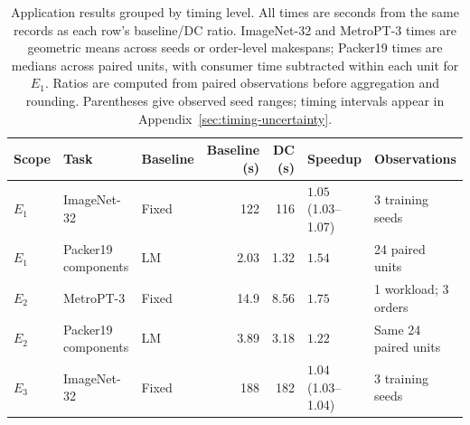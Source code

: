 \begin{table}[!t]
\centering
\caption{Application results grouped by timing level. All times are seconds from the same records as each row's baseline/DC ratio. ImageNet-32 and MetroPT-3 times are geometric means across seeds or order-level makespans; Packer19 times are medians across paired units, with consumer time subtracted within each unit for $E_1$. Ratios are computed from paired observations before aggregation and rounding. Parentheses give observed seed ranges; timing intervals appear in Appendix~\ref{sec:timing-uncertainty}.}
\label{tab:main-results}
\small
\setlength{\tabcolsep}{5pt}
\renewcommand{\arraystretch}{1.15}
\begin{tabular}{@{}lllrrll@{}}
\toprule
Scope & Task & Baseline & Baseline (s) & DC (s) & Speedup & Observations \\
\midrule
$E_1$ & ImageNet-32 & Fixed & 122 & 116 & $1.05$ (1.03--1.07) & 3 training seeds \\
$E_1$ & Packer19 components & LM & 2.03 & 1.32 & $1.54$ & 24 paired units \\
$E_2$ & MetroPT-3 & Fixed & 14.9 & 8.56 & $1.75$ & 1 workload; 3 orders \\
$E_2$ & Packer19 components & LM & 3.89 & 3.18 & $1.22$ & Same 24 paired units \\
$E_3$ & ImageNet-32 & Fixed & 188 & 182 & $1.04$ (1.03--1.04) & 3 training seeds \\
\bottomrule
\end{tabular}
\end{table}
